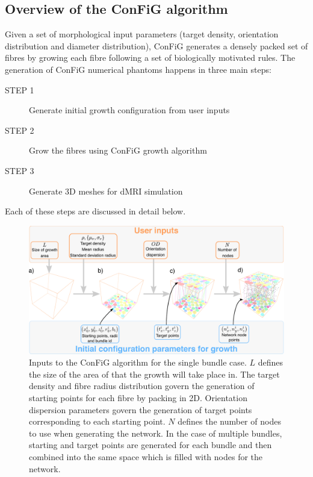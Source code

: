\subsection{Overview of the ConFiG algorithm}
\label{sec:config-alg-overview}
Given a set of morphological input parameters (target density, orientation distribution and diameter distribution), ConFiG generates a densely packed set of fibres by growing each fibre following a set of biologically motivated rules. The generation of ConFiG numerical phantoms happens in three main steps:
\begin{description}
  \item [STEP 1] Generate initial growth configuration from user inputs
  \item [STEP 2] Grow the fibres using ConFiG growth algorithm
  \item [STEP 3] Generate 3D meshes for dMRI simulation
\end{description}
Each of these steps are discussed in detail below.
\begin{figure}[t]
  \centering
  \includegraphics[width=\textwidth]{figures/config/method_inputs_only.eps}
  \caption[Inputs to the ConFiG algorithm]{Inputs to the ConFiG algorithm for the single bundle case. $L$ defines the size of the area of that the growth will take place in. The target density and fibre radius distribution govern the generation of starting points for each fibre by packing in 2D. Orientation dispersion parameters govern the generation of target points corresponding to each starting point. $N$ defines the number of nodes to use when generating the network. In the case of multiple bundles, starting and target points are generated for each bundle and then combined into the same space which is filled with nodes for the network. }
  \label{fig:config_inputs}
\end{figure}

